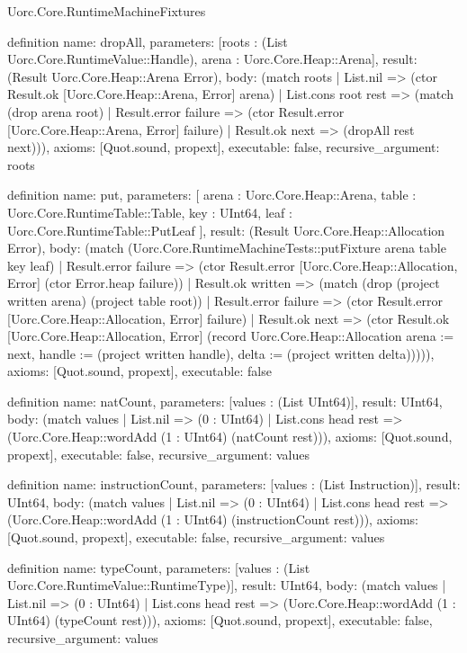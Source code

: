 \begin{lexlean}{Uorc.Core.RuntimeMachineFixtures}
\begin{semanticmodule}
definition{
  name: dropAll,
  parameters: [roots : (List Uorc.Core.RuntimeValue::Handle), arena : Uorc.Core.Heap::Arena],
  result: (Result Uorc.Core.Heap::Arena Error),
  body: (match roots
    | List.nil => (ctor Result.ok [Uorc.Core.Heap::Arena, Error] arena)
    | List.cons root rest => (match (drop arena root)
      | Result.error failure => (ctor Result.error [Uorc.Core.Heap::Arena, Error] failure)
      | Result.ok next => (dropAll rest next))),
  axioms: [Quot.sound, propext],
  executable: false,
  recursive_argument: roots
}

definition{
  name: put,
  parameters: [
    arena : Uorc.Core.Heap::Arena,
    table : Uorc.Core.RuntimeTable::Table,
    key : UInt64,
    leaf : Uorc.Core.RuntimeTable::PutLeaf
  ],
  result: (Result Uorc.Core.Heap::Allocation Error),
  body: (match (Uorc.Core.RuntimeMachineTests::putFixture arena table key leaf)
    | Result.error failure => (ctor Result.error [Uorc.Core.Heap::Allocation, Error] (ctor Error.heap failure))
    | Result.ok written => (match (drop (project written arena) (project table root))
      | Result.error failure => (ctor Result.error [Uorc.Core.Heap::Allocation, Error] failure)
      | Result.ok next => (ctor Result.ok [Uorc.Core.Heap::Allocation, Error] (record Uorc.Core.Heap::Allocation {arena := next, handle := (project written handle), delta := (project written delta)})))),
  axioms: [Quot.sound, propext],
  executable: false
}

definition{
  name: natCount,
  parameters: [values : (List UInt64)],
  result: UInt64,
  body: (match values
    | List.nil => (0 : UInt64)
    | List.cons head rest => (Uorc.Core.Heap::wordAdd (1 : UInt64) (natCount rest))),
  axioms: [Quot.sound, propext],
  executable: false,
  recursive_argument: values
}

definition{
  name: instructionCount,
  parameters: [values : (List Instruction)],
  result: UInt64,
  body: (match values
    | List.nil => (0 : UInt64)
    | List.cons head rest => (Uorc.Core.Heap::wordAdd (1 : UInt64) (instructionCount rest))),
  axioms: [Quot.sound, propext],
  executable: false,
  recursive_argument: values
}

definition{
  name: typeCount,
  parameters: [values : (List Uorc.Core.RuntimeValue::RuntimeType)],
  result: UInt64,
  body: (match values
    | List.nil => (0 : UInt64)
    | List.cons head rest => (Uorc.Core.Heap::wordAdd (1 : UInt64) (typeCount rest))),
  axioms: [Quot.sound, propext],
  executable: false,
  recursive_argument: values
}


\end{semanticmodule}
\end{lexlean}
